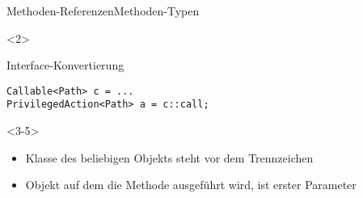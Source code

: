 \begin{frame}[fragile]{Methoden-Referenzen}{Methoden-Typen}
\begin{onlyenv}
        \begin{onlyenv}<2>
            \begin{center}
                \begin{minipage}[b]{0.75\textwidth}
                    \begin{block}{Interface-Konvertierung \citep{goetz13}}
                        \begin{lstlisting}
Callable<Path> c = ...
PrivilegedAction<Path> a = c::call;    
                        \end{lstlisting}
                    \end{block}
                \end{minipage}
            \end{center}
        \end{onlyenv}
    \end{onlyenv}
    \begin{onlyenv}<3-5>
        \begin{itemize}
            \item<3-> Klasse des beliebigen Objekts steht vor dem Trennzeichen
            \item<4-> Objekt auf dem die Methode ausgeführt wird, ist erster Parameter
        \end{itemize}


\end{onlyenv}
\end{frame}
